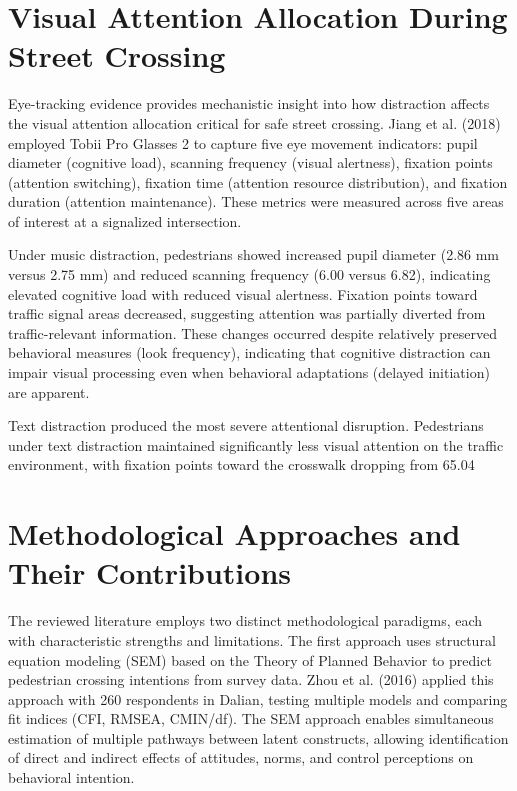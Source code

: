 \documentclass{article}
\begin{document}
\section{Visual Attention Allocation During Street Crossing}
Eye-tracking evidence provides mechanistic insight into how distraction affects the visual attention allocation critical for safe street crossing. Jiang et al. (2018) employed Tobii Pro Glasses 2 to capture five eye movement indicators: pupil diameter (cognitive load), scanning frequency (visual alertness), fixation points (attention switching), fixation time (attention resource distribution), and fixation duration (attention maintenance). These metrics were measured across five areas of interest at a signalized intersection. \cite{09_2018_jiang_aap}

Under music distraction, pedestrians showed increased pupil diameter (2.86 mm versus 2.75 mm) and reduced scanning frequency (6.00 versus 6.82), indicating elevated cognitive load with reduced visual alertness. Fixation points toward traffic signal areas decreased, suggesting attention was partially diverted from traffic-relevant information. These changes occurred despite relatively preserved behavioral measures (look frequency), indicating that cognitive distraction can impair visual processing even when behavioral adaptations (delayed initiation) are apparent. \cite{09_2018_jiang_aap}

Text distraction produced the most severe attentional disruption. Pedestrians under text distraction maintained significantly less visual attention on the traffic environment, with fixation points toward the crosswalk dropping from 65.04%

\section{Methodological Approaches and Their Contributions}
The reviewed literature employs two distinct methodological paradigms, each with characteristic strengths and limitations. The first approach uses structural equation modeling (SEM) based on the Theory of Planned Behavior to predict pedestrian crossing intentions from survey data. Zhou et al. (2016) applied this approach with 260 respondents in Dalian, testing multiple models and comparing fit indices (CFI, RMSEA, CMIN/df). The SEM approach enables simultaneous estimation of multiple pathways between latent constructs, allowing identification of direct and indirect effects of attitudes, norms, and control perceptions on behavioral intention. \cite{08_2016_zhou_aap}
\end{document}

